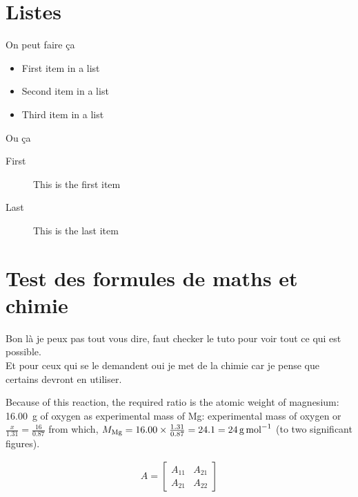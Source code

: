 \documentclass[twoside,10pt,openany,a4paper]{rapport}
\begin{document}
  \section{Listes}
  On peut faire ça\\

  \begin{itemize}
  \item First item in a list 
  \item Second item in a list 
  \item Third item in a list
  \end{itemize}

  Ou ça\\

  \begin{description}
  \item[First] This is the first item
  \item[Last] This is the last item
  \end{description}

  \section{Test des formules de maths et chimie}
  Bon là je peux pas tout vous dire, faut checker le tuto pour voir tout ce qui est possible.\\
  Et pour ceux qui se le demandent oui je met de la chimie car je pense que certains devront en utiliser.\\

  \begin{center}\end{center}
  Because of this reaction, the required ratio is the atomic weight of magnesium: \SI{16.00}{\gram} of oxygen as experimental mass of Mg: experimental mass of oxygen or $\frac{x}{1.31}=\frac{16}{0.87}$ from which, $M_{\ce{Mg}} = 16.00 \times \frac{1.31}{0.87} = 24.1 = \SI{24}{\gram\per\mole}$ (to two significant figures).

  \begin{align}
    A = 
    \begin{bmatrix}
      A_{11} & A_{21} \\
      A_{21} & A_{22}
    \end{bmatrix}
  \end{align}
\end{document}
